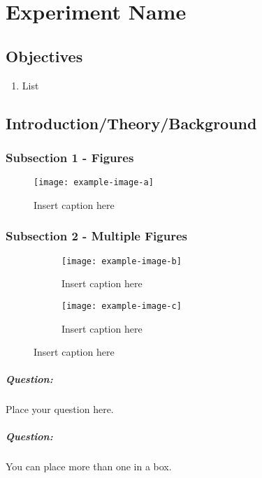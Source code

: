 \chapter{Experiment Name}

\section*{Objectives}

\begin{enumerate}
\itemsep0em
\item List
\end{enumerate}



\section*{Introduction/Theory/Background}

\subsection*{Subsection 1 - Figures}
\begin{figure}[!htb]
    \centering
    \texttt{[image: example-image-a]}
    \caption{Insert caption here}
    \label{fig:<name>}
\end{figure}

\subsection*{Subsection 2 - Multiple Figures}

\begin{figure}[!htb]
\captionsetup[subfigure]{justification=centering}
\centering
        \begin{subfigure}[b]{0.5\textwidth}
        \centering
                \texttt{[image: example-image-b]}
                \caption{Insert caption here}
                \label{fig:<name>}
        \end{subfigure}\hfill
        \begin{subfigure}[b]{0.5\textwidth}
        \centering
                \texttt{[image: example-image-c]}
                \caption{Insert caption here}
                \label{fig:<name>}
        \end{subfigure}
        \par\bigskip
\end{figure}


\begin{question}
\paragraph{Question:} Place your question here.~\\

\paragraph{Question:} You can place more than one in a box.
\end{question}

